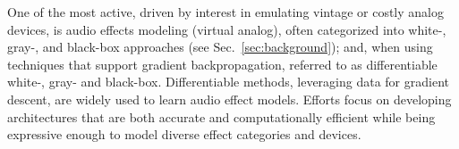 One of the most active, driven by interest in emulating vintage or costly analog devices, is audio effects modeling (virtual analog), often categorized into white-, gray-, and black-box approaches (see Sec.~\ref{sec:background});
and, when using techniques that support gradient backpropagation, referred to as differentiable white-, gray- and black-box.
Differentiable methods, leveraging data for gradient descent, are widely used to learn audio effect models. 
Efforts focus on developing architectures that are both accurate and computationally efficient while being expressive enough to model diverse effect categories and devices.

